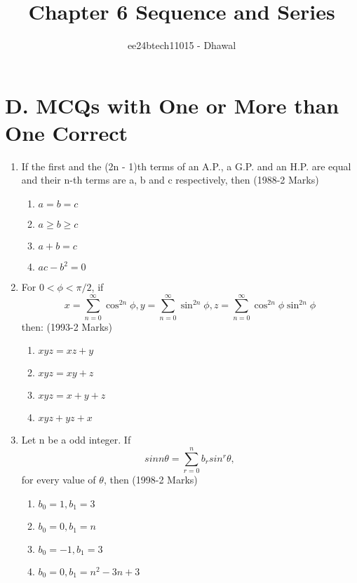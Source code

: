 \documentclass[journal,12pt,twocolumn]{IEEEtran}
\theoremstyle{remark}
\begin{document}

\vspace{3cm}

\title{Chapter 6 Sequence and Series}
\author{ee24btech11015 - Dhawal}
\maketitle
\newpage
\bigskip

\renewcommand{\thefigure}{\theenumi}
\renewcommand{\thetable}{\theenumi}

\section*{D. MCQs with One or More than One Correct}
\begin{enumerate}
    \item If the first and the (2n - 1)th terms of an A.P., a G.P. and an H.P. are equal and their n-th terms are a, b and c respectively, then {(1988-2 Marks)}
\begin{multicols}{2}
\begin{enumerate}
\item $a=b=c$
\item $a \geq b \geq c$
\item $a+b=c$
\item $ac-b^2=0$
\end{enumerate}
\end{multicols}

\item For $0 < \phi < \pi /2$, if 
\begin{equation*}
x=\sum_{n=0}^{\infty} \cos^{2n} \phi ,
y=\sum_{n=0}^{\infty} \sin^{2n} \phi ,
z=\sum_{n=0}^{\infty} \cos^{2n} \phi \sin^{2n} \phi
\end{equation*}
then: \hfill{(1993-2 Marks)}
\begin{multicols}{2}
\begin{enumerate}
\item $xyz=xz+y$
\item $xyz=xy+z$
\item $xyz=x+y+z$
\item $xyz+yz+x$
\end{enumerate}
\end{multicols}

\item Let n be a odd integer. If 
\begin{equation*}
sin n\theta= \sum_{r=0}^{n} b_r sin^{r} \theta, 
\end{equation*}
for every value of $\theta$, then
\hfill{(1998-2 Marks)}
\begin{enumerate}
\item $b_0=1, b_1=3$
\item $b_0=0, b_1=n$
\item $b_0=-1, b_1=3$
\item $b_0=0, b_1=n^2-3n+3$
\end{enumerate}


\end{enumerate}
\end{document}

